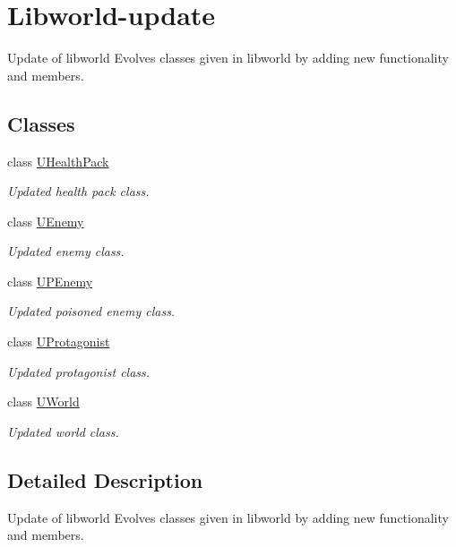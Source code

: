 \hypertarget{group__libworld-update}{}\section{Libworld-\/update}
\label{group__libworld-update}


Update of libworld Evolves classes given in libworld by adding new functionality and members.  


\subsection*{Classes}
\begin{DoxyCompactItemize}
\item 
class \hyperlink{classUHealthPack}{U\+Health\+Pack}
\begin{DoxyCompactList}\small\item\em Updated health pack class. \end{DoxyCompactList}\item 
class \hyperlink{classUEnemy}{U\+Enemy}
\begin{DoxyCompactList}\small\item\em Updated enemy class. \end{DoxyCompactList}\item 
class \hyperlink{classUPEnemy}{U\+P\+Enemy}
\begin{DoxyCompactList}\small\item\em Updated poisoned enemy class. \end{DoxyCompactList}\item 
class \hyperlink{classUProtagonist}{U\+Protagonist}
\begin{DoxyCompactList}\small\item\em Updated protagonist class. \end{DoxyCompactList}\item 
class \hyperlink{classUWorld}{U\+World}
\begin{DoxyCompactList}\small\item\em Updated world class. \end{DoxyCompactList}\end{DoxyCompactItemize}


\subsection{Detailed Description}
Update of libworld Evolves classes given in libworld by adding new functionality and members. 

